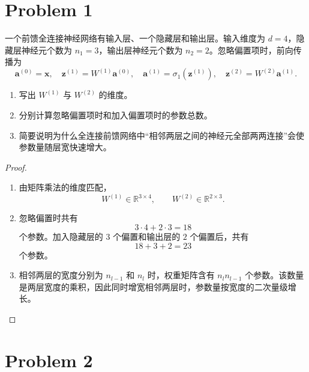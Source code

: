 \section*{Problem 1}

一个前馈全连接神经网络有输入层、一个隐藏层和输出层。输入维度为 $d = 4$，隐藏层神经元个数为 $n_1 = 3$，输出层神经元个数为 $n_2 = 2$。忽略偏置项时，前向传播为
\[
\bm{a}^{(0)} = \bm{x},\quad
\bm{z}^{(1)} = W^{(1)} \bm{a}^{(0)},\quad
\bm{a}^{(1)} = \sigma_1(\bm{z}^{(1)}),\quad
\bm{z}^{(2)} = W^{(2)} \bm{a}^{(1)}.
\]
\begin{enumerate}
    \item 写出 $W^{(1)}$ 与 $W^{(2)}$ 的维度。
    \item 分别计算忽略偏置项时和加入偏置项时的参数总数。
    \item 简要说明为什么全连接前馈网络中“相邻两层之间的神经元全部两两连接”会使参数量随层宽快速增大。
\end{enumerate}

\begin{proof}
    \begin{enumerate}
        \item 由矩阵乘法的维度匹配，
        \[
            W^{(1)}\in\mathbb{R}^{3\times4},\qquad
            W^{(2)}\in\mathbb{R}^{2\times3}.
        \]
        \item 忽略偏置时共有
        \[
            3\cdot4+2\cdot3=\boxed{18}
        \]
        个参数。加入隐藏层的 $3$ 个偏置和输出层的 $2$ 个偏置后，共有
        \[
            18+3+2=\boxed{23}
        \]
        个参数。
        \item 相邻两层的宽度分别为 $n_{l-1}$ 和 $n_l$ 时，权重矩阵含有 $n_ln_{l-1}$ 个参数。该数量是两层宽度的乘积，因此同时增宽相邻两层时，参数量按宽度的二次量级增长。
    \end{enumerate}
\end{proof}

\section*{Problem 2}

